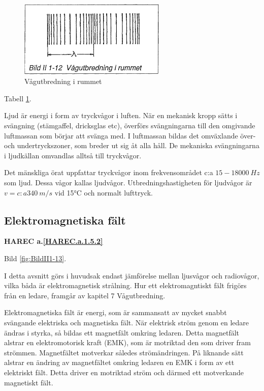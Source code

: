 \begin{figure}[h]
\begin{center}
\includegraphics[width=7cm]{images/bild_2_1-12}
\caption{Vågutbredning i rummet}
\label{fig:BildII1-12}
\end{center}
\end{figure}

Tabell \ref{fig:BildII1-12}.

Ljud är energi i form av tryckvågor i luften. När en mekanisk kropp sätts i
svängning (stämgaffel, dricksglas etc), överförs svängningarna till den
omgivande luftmassan som börjar att svänga med. I luftmassan bildas det
omväxlande över- och undertryckszoner, som breder ut sig åt alla håll. De
mekaniska svängningarna i ljudkällan omvandlas alltså till tryckvågor.

Det mänskliga örat uppfattar tryckvågor inom frekvensområdet c:a
\(15-18000\ Hz\) som ljud. Dessa vågor kallas ljudvågor. Utbredningshastigheten
för ljudvågor är \(v = c:a 340\ m/s\) vid  15°C och normalt lufttryck.

\subsection{Elektromagnetiska fält}
\textbf{HAREC a.\ref{HAREC.a.1.5.2}\label{myHAREC.a.1.5.2}}

Bild \ref{fig:BildII1-13}.

I detta avsnitt görs i huvudsak endast jämförelse mellan ljusvågor och
radiovågor, vilka båda är elektromagnetisk strålning. Hur ett elektromagntiskt
fält frigörs från en ledare, framgår av kapitel 7 Vågutbredning.

Elektromagnetiska fält är energi, som är sammansatt av mycket snabbt svängande
elektriska och magnetiska fält. När elektrisk ström genom en ledare ändras i
styrka, så bildas ett magnetfält omkring ledaren. Detta magnetfält alstrar en
elektromotorisk kraft (EMK), som är motriktad den som driver fram strömmen.
Magnetfältet motverkar således strömändringen. På liknande sätt alstrar en
ändring av magnetfältet omkring ledaren en EMK i form av ett elektriskt fält.
Detta driver en motriktad ström och därmed ett motverkande magnetiskt fält.

